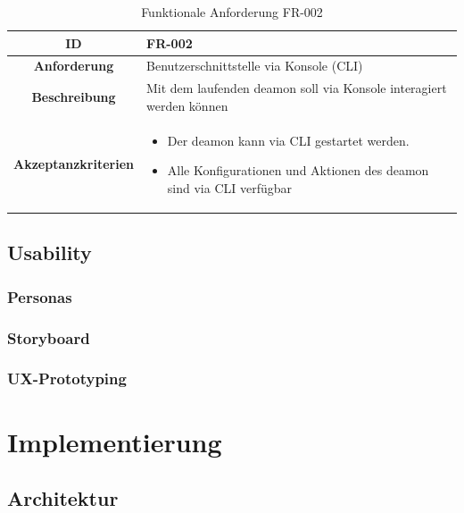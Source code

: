 \documentclass[a4paper,12pt]{report}
\begin{document}
    \begin{table}[h!]
        \centering
        \setlength{\leftmargini}{0.4cm}
        \begin{tabular}{|c|p{10cm}|}
            \hline
            \textbf{ID} & FR-002 \\ \hline
            \textbf{Anforderung} & Benutzerschnittstelle via Konsole (CLI) \\ \hline
            \textbf{Beschreibung} & Mit dem laufenden deamon soll via Konsole interagiert werden können \\ \hline
            \textbf{Akzeptanzkriterien} &
            \begin{itemize}
                \item Der deamon kann via CLI gestartet werden.
                \item Alle Konfigurationen und Aktionen des deamon sind via CLI verfügbar
            \end{itemize}
            \\ \hline
        \end{tabular}
        \caption{Funktionale Anforderung FR-002}\label{tab:table2}
    \end{table}

    \section{Usability}

    \subsection{Personas}

    \subsection{Storyboard}

    \subsection{UX-Prototyping}


    \chapter{Implementierung}


    \section{Architektur}
\end{document}

